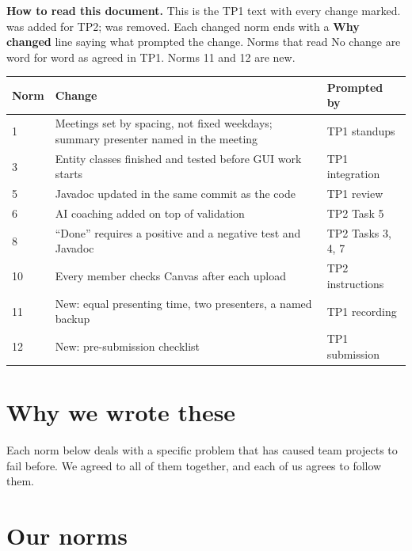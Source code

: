 \documentclass[11pt]{article}
\begin{document}

\begin{minipage}{\linewidth}
\small
\textbf{How to read this document.} This is the TP1 text with every change marked.
 was added for TP2;  was removed.
Each changed norm ends with a \textsf{\textbf{Why changed}} line saying what prompted the change.
Norms that read \textsf{No change} are word for word as agreed in TP1. Norms 11 and 12 are new.
\end{minipage}

\medskip
\begin{tabularx}{\linewidth}{@{}l X l@{}}
\toprule
\textbf{Norm} & \textbf{Change} & \textbf{Prompted by} \\
\midrule
1 & Meetings set by spacing, not fixed weekdays; summary presenter named in the meeting & TP1 standups \\
3 & Entity classes finished and tested before GUI work starts & TP1 integration \\
5 & Javadoc updated in the same commit as the code & TP1 review \\
6 & AI coaching added on top of validation & TP2 Task 5 \\
8 & ``Done'' requires a positive and a negative test and Javadoc & TP2 Tasks 3, 4, 7 \\
10 & Every member checks Canvas after each upload & TP2 instructions \\
11 & New: equal presenting time, two presenters, a named backup & TP1 recording \\
12 & New: pre-submission checklist & TP1 submission \\
\bottomrule
\end{tabularx}

\section*{Why we wrote these}
Each norm below deals with a specific problem that has caused team projects to fail before.
We agreed to all of them together, and each of us agrees to follow them.

\section*{Our norms}
\end{document}
